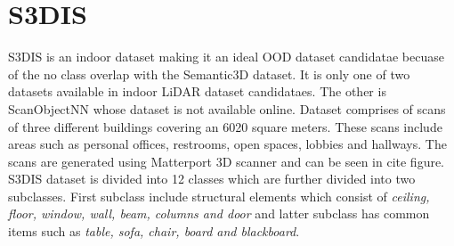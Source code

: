 \newpage
\section{S3DIS}
S3DIS is an indoor dataset making it an ideal OOD dataset candidatae becuase of the no class overlap with the Semantic3D dataset.
It is only one of two datasets available in indoor LiDAR dataset candidataes. 
The other is ScanObjectNN whose dataset is not available online.
Dataset comprises of scans of three different buildings covering an 6020 square meters.
These scans include areas such as personal offices, restrooms, open spaces, lobbies and hallways.
The scans are generated using Matterport 3D scanner and can be seen in cite figure.
S3DIS dataset is divided into 12 classes which are further divided into two subclasses.
First subclass include structural elements which consist of \textit{ceiling, floor, window, wall, beam, columns and door}
and latter subclass has common items such as \textit{table, sofa, chair, board and blackboard}.

